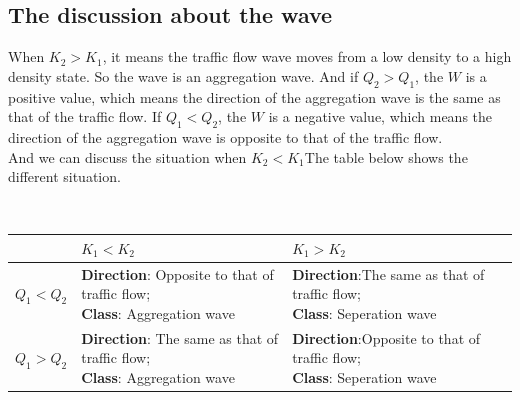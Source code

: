 \documentclass{mcmthesis}
\begin{document}
\subsection{The discussion about the wave}
When $K_{2}>K_{1}$, it means the traffic flow wave moves from a low density to a high density state. So the wave is an aggregation wave. And if $ Q_{2}>Q_{1} $, the $W$ is a positive value, which means the direction of the aggregation wave is the same as that of the traffic flow. If $ Q_{1}<Q_{2} $, the $W$ is a negative value, which means the direction of the aggregation wave is opposite to that of the traffic flow. \\
\indent And we can discuss the situation when $K_{2}<K_{1}$The table below shows the different situation.\\
\begin{table}[H]
        \setlength{\abovecaptionskip}{0pt}
        \setlength{\belowcaptionskip}{0pt}
		\\
        \begin{tabular}{p{2.7cm}<{\centering}|p{5.5cm}<{\centering}|p{5.5cm}<{\centering}|}
		\hline
		\rowcolor[gray]{0.9}\bf{}	&\bf{$K_{1}<K_{2}$}&\bf{$K_{1}>K_{2}$}	\\
		\hline
		$ Q_{1}<Q_{2} $	 & \makecell[{}{p{5.5cm}}]{\textbf{Direction}: Opposite to that of traffic flow;\\  \textbf{Class}: Aggregation wave  } &\makecell[{}{p{5.5cm}}]{\textbf{Direction}:The same as that of traffic flow;\\ \textbf{Class}: Seperation wave}\\
		\hline
		$Q_{1}>Q_{2} $  & \makecell[{}{p{5.5cm}}]{\textbf{Direction}: The same as that of traffic flow;\\  \textbf{Class}: Aggregation wave  }  
		&\makecell[{}{p{5.5cm}}]{\textbf{Direction}:Opposite to that of traffic flow;\\ \textbf{Class}: Seperation wave}
	\end{tabular}
\end{table}
\end{document}
